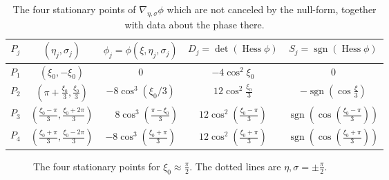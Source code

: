 \documentclass[letterpaper, reqno,final]{amsart}
\DeclareMathOperator{\sgn}{sgn}
\DeclareMathOperator{\Hess}{Hess}
\newcommand{\fhPi}{\frac{\pi}{2}}
\newcommand{\deles}{\nabla_{\eta,\sigma}}
\begin{document}
\begin{table}[b]
\begin{tabular}{|c|c|c|c|c|}
    \hline
     $P_j$ &  $(\eta_j,\sigma_j)$ & $\phi_j = \phi(\xi,\eta_j,\sigma_j)$ & $D_j = \det(\Hess \phi)$ & $S_j = \sgn(\Hess \phi)$\\
     \hline\hline
     $P_1$ & $(\xi_0, -\xi_0)$ & $0$ & $-4\cos^2 \xi_0$ & 0\\\hline
     $P_2$ & $\left(\pi +\frac{\xi_0}{3}, \frac{\xi_0}{3}\right)$ & $-8 \cos^3(\xi_0/3)$ & $12 \cos^2 \frac{\xi_0}{3}$ &$-\sgn(\cos \frac{\xi}{3})$\\\hline
     $P_3$ & $\left(\frac{\xi_0 - \pi}{3}, \frac{\xi_0 + 2\pi}{3}\right)$ & $\phantom{-}8 \cos^3\left(\frac{\pi - \xi_0}{3}\right)$ & $12 \cos^2 \left(\frac{\xi_0 -\pi}{3}\right)$ & $\sgn\left(\cos \left(\frac{\xi_0 - \pi}{3}\right)\right)$\\\hline
     $P_4$ & $\left(\frac{\xi_0 + \pi}{3}, \frac{\xi_0 - 2\pi}{3}\right)$ & $-8 \cos^3\left(\frac{\xi_0 + \pi}{3}\right)$ & $12 \cos^2\left(\frac{\xi_0 + \pi}{3}\right)$ &$\sgn\left(\cos \left(\frac{\xi_0 + \pi}{3}\right)\right)$\\\hline
\end{tabular}
\caption[Function values at the stationary points]{\label{tab:stationary-point-data} The four stationary points of $\deles \phi$ which are not canceled by the null-form, together with data about the phase there.}
\end{table} 

\begin{figure}
    \def\piconst{12}
    \def\picxi{7}
    \begin{center}
    \end{center}
    \caption[The stationary points of $\phi$ for fixed $\xi$]{\label{fig:st-pt-pic} The four stationary points for $\xi_0 \approx \fhPi$.  The dotted lines are $\eta,\sigma = \pm \fhPi$.}
\end{figure}
\end{document}
